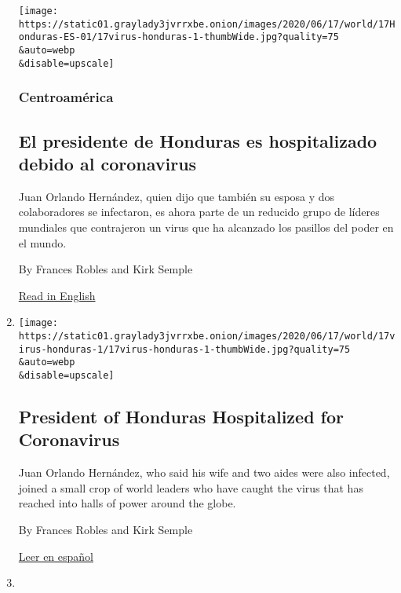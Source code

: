 \begin{enumerate}
  \texttt{[image: https://static01.graylady3jvrrxbe.onion/images/2020/06/17/world/17Honduras-ES-01/17virus-honduras-1-thumbWide.jpg?quality=75\\\&auto=webp\\\&disable=upscale]}

  \hypertarget{centroamuxe9rica}{%
  \subsubsection{Centroamérica}\label{centroamuxe9rica}}

  \hypertarget{el-presidente-de-honduras-es-hospitalizado-debido-al-coronavirus}{%
  \subsection{El presidente de Honduras es hospitalizado debido al
  coronavirus}\label{el-presidente-de-honduras-es-hospitalizado-debido-al-coronavirus}}

  Juan Orlando Hernández, quien dijo que también su esposa y dos
  colaboradores se infectaron, es ahora parte de un reducido grupo de
  líderes mundiales que contrajeron un virus que ha alcanzado los
  pasillos del poder en el mundo.

  By Frances Robles and Kirk Semple

  \href{https://www.nytimes3xbfgragh.onion/2020/06/17/world/americas/honduras-president-coronavirus.html}{Read
  in English}
\item
  \href{/2020/06/17/world/americas/honduras-president-coronavirus.html}{}

  \texttt{[image: https://static01.graylady3jvrrxbe.onion/images/2020/06/17/world/17virus-honduras-1/17virus-honduras-1-thumbWide.jpg?quality=75\\\&auto=webp\\\&disable=upscale]}

  \hypertarget{president-of-honduras-hospitalized-for-coronavirus}{%
  \subsection{President of Honduras Hospitalized for
  Coronavirus}\label{president-of-honduras-hospitalized-for-coronavirus}}

  Juan Orlando Hernández, who said his wife and two aides were also
  infected, joined a small crop of world leaders who have caught the
  virus that has reached into halls of power around the globe.

  By Frances Robles and Kirk Semple

  \href{https://www.nytimes3xbfgragh.onion/es/2020/06/17/espanol/america-latina/presidente-honduras-coronavirus.html}{Leer
  en español}
\item
  \href{/es/2020/06/02/espanol/america-latina/nicaragua-coronavirus-muertes.html}{}


\end{enumerate}
